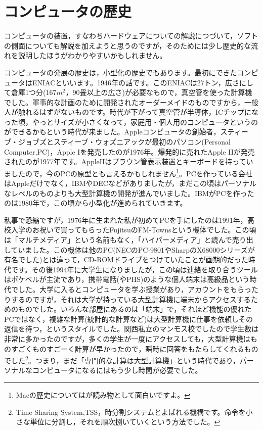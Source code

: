 \documentclass{ltjsbook}
\begin{document}
\section{コンピュータの歴史}
コンピュータの装置，すなわちハードウェアについての解説につづいて，ソフトの側面についても解説を加えようと思うのですが，そのためには少し歴史的な流れを説明したほうがわかりやすいかもしれません。

コンピュータの発展の歴史は，小型化の歴史でもあります。最初にできたコンピュータはENIACといいます。1946年の話です。このENIACは27トン，広さにして倉庫1つ分(167$m^2$，90畳以上の広さ)が必要なもので，真空管を使った計算機でした。軍事的な計画のために開発されたオーダーメイドのものですから，一般人が触れるはずがないものです。時代が下がって真空管が半導体，ICチップになった頃，やっとサイズが小さくなって，家庭用・個人用のコンピュータというのができるかもという時代が来ました。Appleコンピュータの創始者，スティーブ・ジョブズとスティーブ・ウォズニアックが最初のパソコン(Personal Computer,PC)，Apple Iを発売したのが1976年。爆発的に売れたApple IIが発売されたのが1977年です。AppleIIはブラウン管表示装置とキーボードを持っていましたので，今のPCの原型とも言えるかもしれません\footnote{Macの歴史については\citet{アイザックソン2012}が読み物として面白いですよ。}。PCを作っている会社はAppleだけでなく，IBMやDECなどがありましたが，まだこの頃はパーソナルなレベルのものよりも大型計算機の開発が進んでいました。IBMがPCを作ったのは1980年で，この頃から小型化が進められていきます。

私事で恐縮ですが，1976年に生まれた私が初めてPCを手にしたのは1991年，高校入学のお祝いで買ってもらったFujitsuのFM-Townsという機体でした。この頃は「マルチメディア」という名前もなく，「ハイパーメディア」と読んで売り出していました。この機体は他のPC(NECのPC-9801やSharpのX68000シリーズが有名でした)とは違って，CD-ROMドライブをつけていたことが画期的だった時代です。その後1994年に大学生になりましたが，この頃は連絡を取り合うツールはポケベルが主流であり，携帯電話(やPHS)のような個人端末は高級品という時代でした。大学に入るとコンピュータを学ぶ授業があり，アカウントをもらったりするのですが，それは大学が持っている大型計算機に端末からアクセスするためのものでした。いろんな部屋にあるのは「端末」で，それほど機能の優れたPCではなく，複雑な計算(統計的な計算など)は大型計算機に仕事を依頼しその返信を待つ，というスタイルでした。関西私立のマンモス校でしたので学生数は非常に多かったのですが，多くの学生が一度にアクセスしても，大型計算機はものすごくものすごーく計算が早かったので，瞬時に回答をもたらしてくれるものでした\footnote{Time Sharing System,TSS，時分割システムとよばれる機構です。命令を小さな単位に分割し，それを順次捌いていくという方法でした。}。つまり，まだ「専門的な計算は大型計算機」という時代であり，パーソナルなコンピュータになるにはもう少し時間が必要でした。
\end{document}
